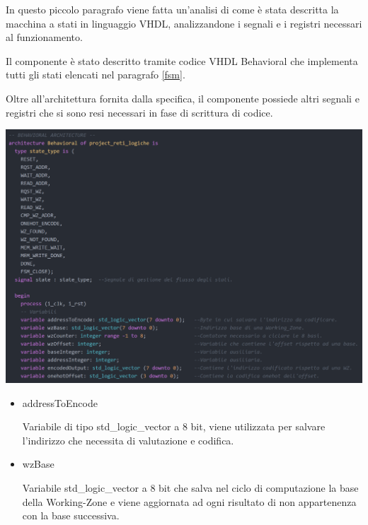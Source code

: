 \documentclass{article}
\newenvironment{gitFont}{\fontfamily{zi4}\selectfont}{\par}
\begin{document}
\begin{flushleft}

In questo piccolo paragrafo viene fatta un'analisi di come è stata descritta la macchina a stati in linguaggio VHDL, analizzandone i segnali e i registri necessari al funzionamento.

Il componente è stato descritto tramite codice VHDL Behavioral che implementa tutti gli stati elencati nel paragrafo \ref{fsm}.

 Oltre all'architettura fornita dalla specifica, il componente possiede altri segnali e registri che si sono resi necessari in fase di scrittura di codice.

\begin{flushleft}
\includegraphics[scale=0.31]{Behavioral}
\end{flushleft}


\begin{itemize}

\item \begin{gitFont}
addressToEncode
\end{gitFont} Variabile di tipo std{\_}logic{\_}vector a 8 bit, viene utilizzata per salvare l'indirizzo che necessita di valutazione e codifica.

\item \begin{gitFont}
wzBase
\end{gitFont} Variabile std{\_}logic{\_}vector a 8 bit che salva nel ciclo di computazione la base della Working-Zone e viene aggiornata ad ogni risultato di non appartenenza con la base successiva.


\end{itemize}
\end{flushleft}
\end{document}
